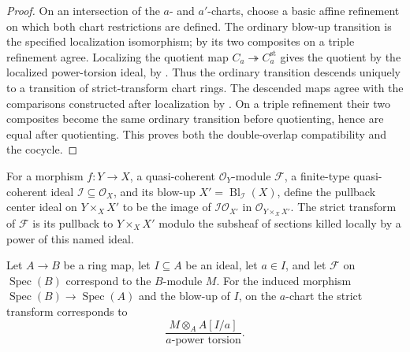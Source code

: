 \begin{proof}
  On an intersection of the $a$- and $a'$-charts, choose a basic affine
  refinement on which both chart restrictions are defined.  The ordinary
  blow-up transition is the specified localization isomorphism; by
   its two composites on a
  triple refinement agree.  Localizing the quotient map
  $C_a\twoheadrightarrow C_a^{\mathrm{st}}$ gives the quotient by the
  localized power-torsion ideal, by
  .  Thus the
  ordinary transition descends uniquely to a transition of strict-transform
  chart rings.  The descended maps agree with the comparisons constructed
  after localization by
  .  On a triple
  refinement their two composites become the same ordinary transition before
  quotienting, hence are equal after quotienting.  This proves both the
  double-overlap compatibility and the cocycle.
\end{proof}

\begin{definition}
  \label{def:nagata-module-strict-transform}

  For a morphism $f\colon Y\to X$, a quasi-coherent
  $\mathcal O_Y$-module $\mathcal F$, a finite-type quasi-coherent ideal
  $\mathcal I\subseteq\mathcal O_X$, and its blow-up
  $X'=\operatorname{Bl}_{\mathcal I}(X)$, define the pullback center ideal on
  $Y\times_XX'$ to be the image of
  $\mathcal I\mathcal O_{X'}$ in $\mathcal O_{Y\times_XX'}$.  The strict
  transform of $\mathcal F$ is its pullback to $Y\times_XX'$ modulo the
  subsheaf of sections killed locally by a power of this named ideal.
\end{definition}

\begin{lemma}
  \label{lemma:nagata-module-strict-transform-chart}

  Let $A\to B$ be a ring map, let $I\subseteq A$ be an ideal, let $a\in I$,
  and let $\mathcal F$ on $\operatorname{Spec}(B)$ correspond to the
  $B$-module $M$.  For the induced morphism
  $\operatorname{Spec}(B)\to\operatorname{Spec}(A)$ and the blow-up of $I$,
  on the $a$-chart the
  strict transform corresponds to
  \[
    \frac{M\otimes_AA[I/a]}
         {a\text{-power torsion}}.
  \]
\end{lemma}

